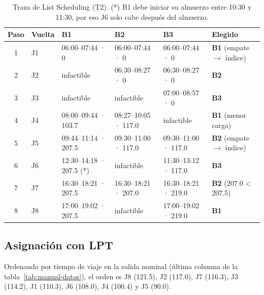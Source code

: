 \begin{table}[H]
\centering\small
\caption{Traza de List Scheduling (T2). (*) B1 debe iniciar su almuerzo entre 10:30 y 11:30, por eso J6 solo cabe después del almuerzo.}\label{tab:traza-ls}
\footnotesize\setlength{\tabcolsep}{4pt}
\begin{tabular}{clllll}
\toprule
Paso & Vuelta & B1 & B2 & B3 & Elegido \\
\midrule
1 & J1 & 06:00--07:44 · 0 & 06:00--07:44 · 0 & 06:00--07:44 · 0 & \textbf{B1} (empate $\to$ índice) \\
2 & J2 & infactible & 06:30--08:27 · 0 & 06:30--08:27 · 0 & \textbf{B2} \\
3 & J3 & infactible & infactible & 07:00--08:57 · 0 & \textbf{B3} \\
4 & J4 & 08:00--09:44 · 103.7 & 08:27--10:05 · 117.0 & infactible & \textbf{B1} (menor carga) \\
5 & J5 & 09:44--11:14 · 207.5 & 09:30--11:00 · 117.0 & 09:30--11:00 · 117.0 & \textbf{B2} (empate $\to$ índice) \\
6 & J6 & 12:30--14:18 · 207.5 (*) & infactible & 11:30--13:12 · 117.0 & \textbf{B3} \\
7 & J7 & 16:30--18:21 · 207.5 & 16:30--18:21 · 207.0 & 16:30--18:21 · 219.0 & \textbf{B2} (207.0 < 207.5) \\
8 & J8 & 17:00--19:02 · 207.5 & infactible & 17:00--19:02 · 219.0 & \textbf{B1} \\
\bottomrule
\end{tabular}
\end{table}

\subsection{Asignación con LPT}
Ordenando por tiempo de viaje en la salida nominal (última columna de la tabla~\ref{tab:manual-datos}), el orden es J8 (121.5), J2 (117.0), J7 (116.3), J3 (114.2), J1 (110.3), J6 (108.0), J4 (100.4) y J5 (90.0).

